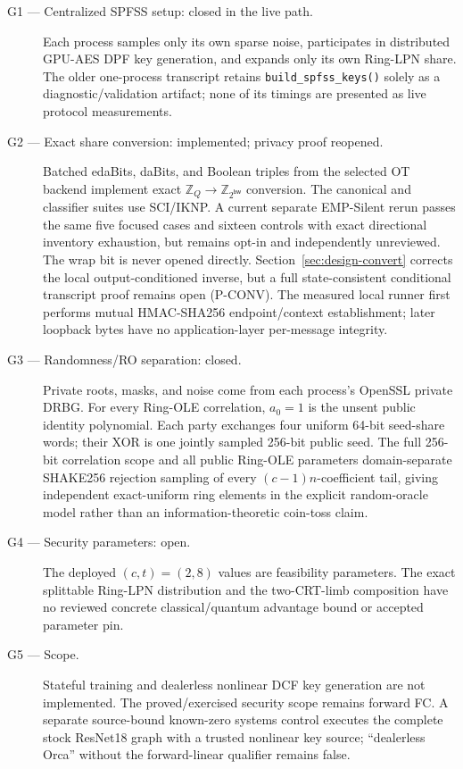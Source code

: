 \documentclass[11pt]{article}
\newcommand{\Z}{\mathbb{Z}}
\newcommand{\bw}{\mathsf{bw}}
\begin{document}
\begin{description}
\item[G1 --- Centralized SPFSS setup: closed in the live path.] Each process
  samples only its own sparse noise, participates in distributed GPU-AES DPF
  key generation, and expands only its own Ring-LPN share. The older
  one-process transcript retains \texttt{build\_spfss\_keys()} solely as a
  diagnostic/validation artifact; none of its timings are presented as live
  protocol measurements.
\item[G2 --- Exact share conversion: implemented; privacy proof reopened.]
  Batched edaBits, daBits, and Boolean triples from the selected OT backend
  implement exact $\Z_Q\to\Z_{2^\bw}$ conversion. The canonical and classifier
  suites use SCI/IKNP. A current separate EMP-Silent rerun passes the same five
  focused cases and sixteen controls with exact directional inventory
  exhaustion, but remains opt-in and independently unreviewed. The wrap bit is
  never opened directly. Section~\ref{sec:design-convert} corrects the local
  output-conditioned inverse, but a full state-consistent conditional
  transcript proof remains open (P-CONV). The measured local runner first performs mutual
  HMAC-SHA256 endpoint/context establishment; later loopback bytes have no
  application-layer per-message integrity.
\item[G3 --- Randomness/RO separation: closed.]
  Private roots, masks, and noise come from each process's OpenSSL private
  DRBG. For every Ring-OLE correlation, $a_0=1$ is the unsent public identity
  polynomial. Each party exchanges four uniform 64-bit seed-share words; their
  XOR is one jointly sampled 256-bit public seed. The full 256-bit correlation
  scope and all public Ring-OLE parameters domain-separate SHAKE256 rejection
  sampling of every $(c-1)n$-coefficient tail, giving independent exact-uniform
  ring elements in the explicit random-oracle model rather than an
  information-theoretic coin-toss claim.
\item[G4 --- Security parameters: open.] The deployed $(c,t)=(2,8)$ values are
  feasibility parameters. The exact splittable Ring-LPN distribution and the
  two-CRT-limb composition have no reviewed concrete classical/quantum
  advantage bound or accepted parameter pin.
\item[G5 --- Scope.] Stateful training and dealerless nonlinear DCF key
  generation are not implemented. The proved/exercised security scope remains
  forward FC. A separate source-bound known-zero systems control executes the
  complete stock ResNet18 graph with a trusted nonlinear key source;
  ``dealerless Orca'' without the forward-linear qualifier remains false.
\end{description}
\end{document}
